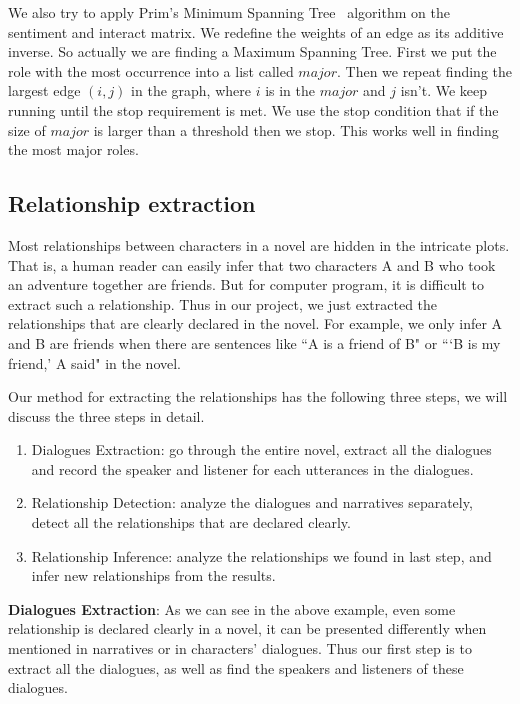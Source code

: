 \documentclass[11pt]{article}
\begin{document}
We also try to apply Prim's Minimum Spanning Tree~\cite{prim} algorithm on the sentiment and interact matrix. We redefine the weights of an edge as its additive inverse. So actually we are finding a Maximum Spanning Tree. First we put the role with the most occurrence into a list called $major$. Then we repeat finding the largest edge $(i, j)$ in the graph, where $i$ is in the $major$ and $j$ isn't. We keep running until the stop requirement is met. We use the stop condition that if the size of $major$ is larger than a threshold then we stop. This works well in finding the most major roles.


\subsection{Relationship extraction} %
\label{ssec:first}

Most relationships between characters in a novel are hidden in the intricate plots. That is, a human reader can easily infer that two characters A and B who took an adventure together are friends. But for computer program, it is difficult to extract such a relationship. Thus in our project, we just extracted the relationships that are clearly declared in the novel. For example, we only infer A and B are friends when there are sentences like ``A is a friend of B" or ```B is my friend,' A said" in the novel.

Our method for extracting the relationships has the following three steps, we will discuss the three steps in detail.
\begin{enumerate}
    \item Dialogues Extraction: go through the entire novel, extract all the dialogues and record the speaker and listener for each utterances in the dialogues.
    \item Relationship Detection: analyze the dialogues and narratives separately, detect all the relationships that are declared clearly.
    \item Relationship Inference: analyze the relationships we found in last step, and infer new relationships from the results.
\end{enumerate}

{\bf Dialogues Extraction}: As we can see in the above example, even some relationship is declared clearly in a novel, it can be presented differently when mentioned in narratives or in characters' dialogues. Thus our first step is to extract all the dialogues, as well as find the speakers and listeners of these dialogues.
\end{document}
